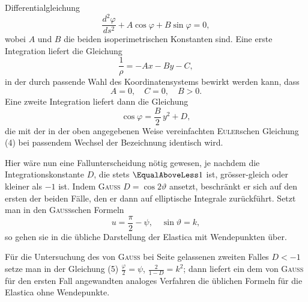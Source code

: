 Differentialgleichung
\[
\frac{d^2\varphi}{ds^2}+A\cos\varphi+B\sin\varphi=0,
\]
wobei $A$ und $B$ die beiden isoperimetrischen Konstanten sind. Eine erste
Integration liefert die Gleichung
\[
\frac1\rho=-Ax-By-C,
\]
in der durch passende Wahl des Koordinatensystems bewirkt werden kann, dass
\[
A=0,\quad C=0,\quad B>0.
\]
Eine zweite Integration liefert dann die Gleichung
\begin{equation*}\tag{5}
\cos\varphi=\frac B2\,y^2+D,
\end{equation*}
\clearpage{}
\noindent die mit der in der oben angegebenen Weise vereinfachten \textsc{Euler}schen Gleichung (4) bei passendem Wechsel der Bezeichnung identisch wird.
\par\noindent\hspace*{\parindent}Hier wäre nun eine Fallunterscheidung nötig gewesen, je nachdem die
Integrationskonstante $D$, die stets $\EqualAboveLess1$ ist, grösser-gleich oder kleiner als $-1$
ist. Indem \textsc{Gauss} $D=\cos2\vartheta$ ansetzt, beschränkt er sich auf den ersten der
beiden Fälle, den er dann auf elliptische Integrale zurückführt. Setzt man
in den \textsc{Gauss}schen Formeln
\[
u=\frac\pi2-\psi,\quad\sin\vartheta=k,
\]
so gehen sie in die übliche Darstellung der Elastica mit Wendepunkten über.
\par\noindent\hspace*{\parindent}Für die Untersuchung des von \textsc{Gauss} bei Seite gelassenen zweiten Falles
$D<-1$ setze man in der Gleichung (5) $\frac\varphi2=\psi$, $\frac2{1-D}=k^2$; dann liefert ein
dem von \textsc{Gauss} für den ersten Fall angewandten analoges Verfahren die üblichen Formeln für die Elastica ohne Wendepunkte.
\clearpage\endgroup
